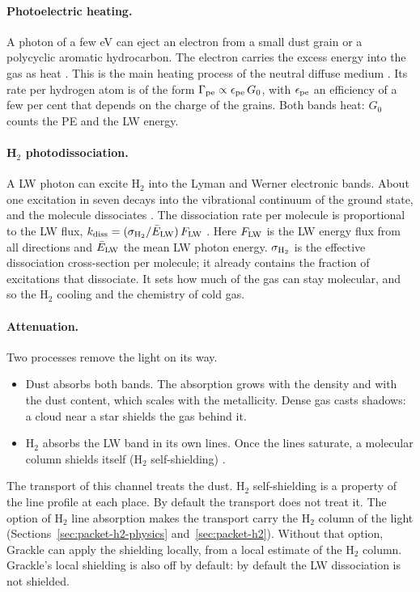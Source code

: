 \paragraph{Photoelectric heating.} A photon of a few eV can eject an electron
from a small dust grain or a polycyclic aromatic hydrocarbon. The electron
carries the excess energy into the gas as heat
\citep{Draine1978,BakesTielens1994}. This is the main heating process of the
neutral diffuse medium \citep{Wolfire1995,Wolfire2003}. Its rate per hydrogen
atom is of the form $\Gamma_{\rm pe}\propto\epsilon_{\rm pe}\,G_0$, with
$\epsilon_{\rm pe}$ an efficiency of a few per cent that depends on the charge of the grains. Both
bands heat: $G_0$ counts the PE and the LW energy.

\paragraph{H$_2$ photodissociation.} A LW photon can excite H$_2$ into the
Lyman and Werner electronic bands. About one excitation in seven decays into
the vibrational continuum of the ground state, and the molecule dissociates
\citep{DraineBertoldi1996}. The dissociation rate per molecule is
proportional to the LW flux,
$k_{\rm diss}=(\sigma_{\rm H_2}/\bar E_{\rm LW})\,F_{\rm LW}$
\citep{Sternberg2014}. Here $F_{\rm LW}$ is the LW energy flux from all
directions and $\bar E_{\rm LW}$ the mean LW photon energy. $\sigma_{\rm H_2}$
is the effective dissociation cross-section per molecule; it already contains
the fraction of excitations that dissociate. It sets how much of the gas can stay molecular, and so
the H$_2$ cooling and the chemistry of cold gas.

\paragraph{Attenuation.} Two processes remove the light on its way.
\begin{itemize}
  \item Dust absorbs both bands. The absorption grows with the density and
    with the dust content, which scales with the metallicity. Dense gas casts
    shadows: a cloud near a star shields the gas behind it.
  \item H$_2$ absorbs the LW band in its own lines. Once the lines saturate,
    a molecular column shields itself (H$_2$ self-shielding)
    \citep{DraineBertoldi1996,WolcottGreenHaiman2019}.
\end{itemize}
The transport of this channel treats the dust. H$_2$ self-shielding is a
property of the line profile at each place. By default the transport does not
treat it. The option of H$_2$ line absorption makes the transport
carry the H$_2$ column of the light (Sections~\ref{sec:packet-h2-physics}
and~\ref{sec:packet-h2}). Without that option, Grackle can apply the
shielding locally, from a local estimate of the H$_2$ column. Grackle's local
shielding is also off by default: by default the LW dissociation is not
shielded.


